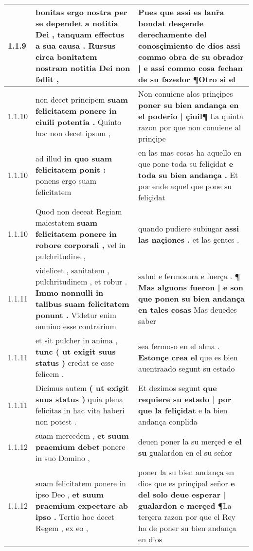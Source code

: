 \begin{tabular}{|p{1cm}|p{6.5cm}|p{6.5cm}|}
1.1.9 & bonitas ergo nostra per se dependet a notitia Dei , \textbf{ tanquam effectus a sua causa . } Rursus circa bonitatem nostram notitia Dei non fallit , & Pues que assi es lanr̃a bondat desçende derechamente del conosçimiento de dios \textbf{ assi commo obra de su obrador | e assi commo cosa fechan de su fazedor } ¶Otro si el \\\hline
1.1.10 & non decet principem \textbf{ suam felicitatem ponere in ciuili potentia . } Quinto hoc non decet ipsum , & Non conuiene alos prinçipes \textbf{ poner su bien andança en el poderio | çiuil¶ } La quinta razon por que non conuiene al prinçipe \\\hline
1.1.10 & ad illud \textbf{ in quo suam felicitatem ponit : } ponens ergo suam felicitatem & en las mas cosas ha aquello en que pone toda su feliçidat \textbf{ e toda su bien andança . } Et por ende aquel que pone su feliçidat \\\hline
1.1.10 & Quod non deceat Regiam maiestatem \textbf{ suam felicitatem ponere in robore corporali , } vel in pulchritudine , & quando pudiere subiugar \textbf{ assi las naçiones . } et las gentes . \\\hline
1.1.11 & videlicet , sanitatem , pulchritudinem , et robur . \textbf{ Immo nonnulli in talibus suam felicitatem ponunt . } Videtur enim omnino esse contrarium & salud e fermosura e fuerça . \textbf{ ¶ Mas alguons fueron | e son que ponen su bien andança en tales cosas } Mas deuedes saber \\\hline
1.1.11 & et sit pulcher in anima , \textbf{ tunc ( ut exigit suus status ) } credat se esse felicem . & sea fermoso en el alma . \textbf{ Estonçe crea el } que es bien auentraado segunt su estado \\\hline
1.1.11 & Dicimus autem \textbf{ ( ut exigit suus status ) } quia plena felicitas in hac vita haberi non potest . & Et dezimos segunt \textbf{ que requiere su estado | por que la feliçidat } e la bien andança conplida \\\hline
1.1.12 & suam mercedem , \textbf{ et suum praemium debet } ponere in suo Domino , & deuen poner la su merçed \textbf{ e el su } gualardon en el su señor \\\hline
1.1.12 & suam felicitatem ponere in ipso Deo , \textbf{ et suum praemium expectare ab ipso . } Tertio hoc decet Regem , ex eo , & poner la su bien andança en dios que es prinçipal señor \textbf{ e del solo deue esperar | gualardon e merçed } ¶La terçera razon por que el Rey ha de poner su bien andança en dios \\\hline

\end{tabular}
